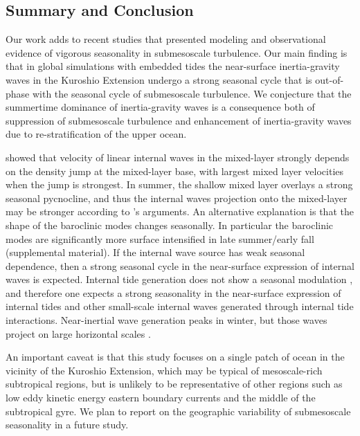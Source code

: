 \documentclass[grl]{agutex2015}
\begin{document}
\begin{article}
\section{Summary and Conclusion}
Our work adds to recent studies that presented modeling \citep{sasaki_etal2014}
and observational \citep{callies_etal2015,buckingham_etal2016} evidence of vigorous seasonality in
submesoscale turbulence. Our main finding is that in global simulations with embedded tides the
near-surface inertia-gravity waves in the Kuroshio Extension undergo
a strong seasonal cycle that is out-of-phase with the seasonal cycle of
submesoscale turbulence. We conjecture that the summertime dominance of inertia-gravity waves
 \citep{callies_etal2015} is a consequence both of suppression of submesoscale turbulence and
enhancement of inertia-gravity waves due to re-stratification of
the upper ocean.

\cite{dasaro1978} showed that velocity of linear internal waves
in the mixed-layer strongly depends on the density jump at the mixed-layer
base, with largest mixed layer velocities when the jump is strongest.
In summer, the shallow mixed layer overlays a strong seasonal pycnocline,
and thus the internal waves projection onto the mixed-layer may be stronger
according to \cite{dasaro1978}'s arguments. An
alternative explanation is that the shape of the baroclinic modes
changes seasonally. In particular the baroclinic modes are
significantly more surface intensified in late summer/early fall
 (supplemental material).
If the internal wave source has weak seasonal dependence, then a strong
seasonal cycle in the near-surface expression of internal waves is expected.
Internal tide generation does not show a seasonal modulation \citep[e.g.,][]{alford2003},
and therefore one expects a strong seasonality in the near-surface
expression of internal tides and
other small-scale internal waves generated through internal tide interactions.
Near-inertial wave generation peaks in winter, but those waves project on large
horizontal scales \citep[e.g, ][]{qi_etal1995}.



An important caveat is that this study focuses on a single patch of ocean in the
vicinity of the Kuroshio Extension, which may be typical of mesoscale-rich
subtropical regions, but is unlikely to be
representative of other regions such as low eddy kinetic energy eastern boundary currents
and the middle of the subtropical gyre.  We plan to report on the geographic variability of submesoscale
 seasonality in a future study.


\end{article}
\end{document}
